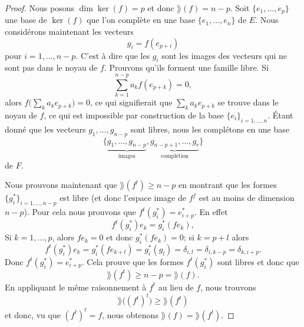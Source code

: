 \begin{proof}
    Nous posons \( \dim\ker(f)=p\) et donc \( \rang(f)=n-p\). Soit \( \{ e_1,\ldots, e_p \}\) une base de \( \ker(f)\) que l'on complète en une base \( \{ e_1,\ldots, e_n \}\) de \( E\). Nous considérons maintenant les vecteurs
    \begin{equation}
        g_i=f(e_{p+i})
    \end{equation}
    pour \( i=1,\ldots, n-p\). C'est à dire que les \( g_i\) sont les images des vecteurs qui ne sont pas dans le noyau de \( f\). Prouvons qu'ils forment une famille libre. Si
    \begin{equation}
        \sum_{k=1}^{n-p}a_kf(e_{p+k})=0,
    \end{equation}
    alors \( f\big( \sum_ka_ke_{p+k} \big)=0\), ce qui signifierait que \( \sum_ka_ke_{p+k}\) se trouve dans le noyau de \( f\), ce qui est impossible par construction de la base \( \{ e_i \}_{i=1,\ldots, n}\). Étant donné que les vecteurs \( g_1,\ldots, g_{n-p}\) sont libres, nous les complétons en une base
    \begin{equation}
        \{ \underbrace{g_1,\ldots, g_{n-p}}_{\text{images}},\underbrace{g_{n-p+1},\ldots, g_r}_{\text{complétion}} \}
    \end{equation}
    de \( F\).

    Nous prouvons maintenant que \( \rang(f^t)\geq n-p\) en montrant que les formes \( \{ g_i^* \}_{i=1,\ldots, n-p}\) est libre (et donc l'espace image de \( f^f\) est au moins de dimension \( n-p\)). Pour cela nous prouvons que \( f^t(g_i^*)=e^*_{i+p}\). En effet
    \begin{equation}
        f^t(g^*_i)e_k=g_i^*(fe_k),
    \end{equation}
    Si \( k=1,\ldots, p\), alors \( fe_k=0\) et donc \( g_i^*(fe_k)=0\); si \( k=p+l\) alors
    \begin{equation}
        f^t(g_i^*)e_k=g_i^*(fe_{k+l})=g^*_i(g_l)=\delta_{i,l}=\delta_{i,k-p}=\delta_{k,i+p}.
    \end{equation}
    Donc \( f^t(g_i^*)=e^*_{i+p}\). Cela prouve que les formes \( f^t(g_i^*)\) sont libres et donc que
    \begin{equation}
        \rang(f^t)\geq n-p=\rang(f).
    \end{equation}
    En appliquant le même raisonnement à \( f^t\) au lieu de \( f\), nous trouvons
    \begin{equation}
        \rang\big( (f^t)^t \big)\geq \rang(f^t)
    \end{equation}
    et donc, vu que \( (f^t)^t=f\), nous obtenons \( \rang(f)=\rang(f^t)\).
    
\end{proof}

